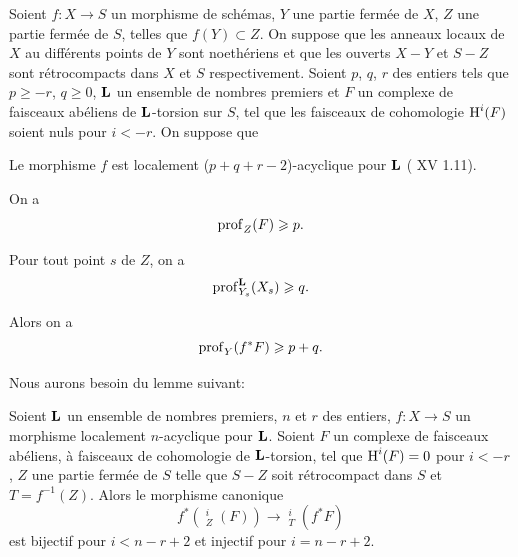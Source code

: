 \begin{theoreme} \label{XIV.1.13}
Soient $f:X\to S$ un morphisme de sch\'emas, $Y$ une partie ferm\'ee de $X$, $Z$ une partie ferm\'ee de $S$, telles que $f(Y)\subset Z$. On suppose que les anneaux locaux de $X$ au diff\'erents points de $Y$ sont noeth\'eriens et que les ouverts $X-Y$ et $S-Z$ sont r\'etrocompacts dans $X$ et $S$ respectivement. Soient $p$, $q$, $r$ des entiers tels que $p\geq -r$, $q\geq 0$, $\mathbf{L}$ un ensemble de nombres premiers et $F$ un complexe de faisceaux ab\'eliens de $\mathbf{L}$-torsion sur $S$, tel que les faisceaux de cohomologie $\operatorname{H}^i(F)$ soient nuls pour $i<-r$. On suppose que
\begin{enumeratea}
\item
Le morphisme $f$ est localement ($p+q+r-2$)-acyclique pour $\mathbf{L}$ \textup{( XV 1.11)}.
\item
On a
$$
\operatorname{prof}_Z(F)\geqslant p.
$$
\item
Pour tout point $s$ de $Z$, on a
$$
\operatorname{prof}_{Y_s}^{\mathbf{L}}(X_s)\geqslant q.
$$
\end{enumeratea}
\noindent
Alors on a
$$
\operatorname{prof}_Y(f^*F)\geqslant p+q.
$$
\end{theoreme}

Nous aurons besoin du lemme suivant:

\begin{sublemme} \label{XIV.1.13.1}
Soient $\mathbf{L}$ un ensemble de nombres premiers, $n$ et $r$ des entiers, $f:X\to S$ un morphisme localement $n$-acyclique pour $\mathbf{L}$. Soient $F$ un complexe de faisceaux ab\'eliens, \`a faisceaux de cohomologie de $\mathbf{L}$-torsion, tel que $\operatorname{H}^i(F)=0$ pour $i<-r$, $Z$ une partie ferm\'ee de $S$ telle que $S-Z$ soit r\'etrocompact dans $S$ et $T=f^{-1}(Z)$. Alors le morphisme canonique
$$f^*({\mathop{\underline{\mathrm{H}}}\nolimits}_Z^i(F))\to {\mathop{\underline{\mathrm{H}}}\nolimits}_T^i(f^*F)$$
est bijectif pour $i<n-r+2$ et injectif pour $i=n-r+2$.
\end{sublemme}


